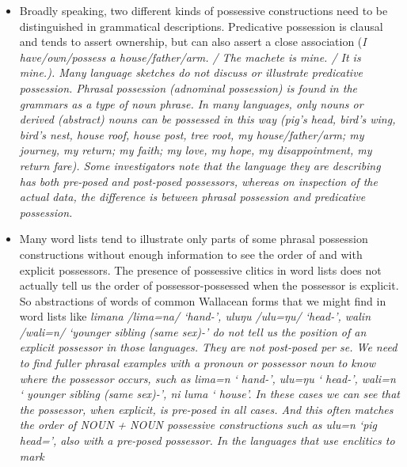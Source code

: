 \begin{itemize}
	\item Broadly speaking,
				two different kinds of possessive constructions need to be distinguished in grammatical descriptions.
				Predicative possession is clausal
				and tends to assert ownership,
				but can also assert a close association (\it{I have/own/possess a house/father/arm.
				/ The machete is mine.
				/ It is mine.}).
				Many language sketches do not discuss or illustrate predicative possession.
				Phrasal possession (adnominal possession) is found in the grammars
				as a type of noun phrase.
				In many languages, only nouns or derived (abstract) nouns can
				be possessed in this way (\it{pig’s head,
				bird’s wing, bird’s nest,
				house roof, house post,
				tree root, my house/father/arm; my journey,
				my return; my faith; my love,
				my hope, my disappointment, my return fare}).
				Some investigators note that the language they are describing
				has both pre-posed and post-posed possessors, whereas on inspection of the actual
				data, the difference is between phrasal possession and predicative possession.
	\item Many word lists tend to illustrate only parts of some
				phrasal possession constructions without enough information to
				see the order of 
				and  with explicit possessors.
				The presence of possessive clitics in word lists does not actually
				tell us the order of possessor-possessed when the possessor is explicit.
				So abstractions of words of common Wallacean forms that we might
				find in word lists like \it{limana} /lima=na/ ‘hand-’,
				\it{uluŋu} /ulu=ŋu/ ‘head-’, \it{walin} /wali=n/
				‘younger sibling (same sex)-’ do not tell us the
				position of an explicit possessor in those languages.
				They are not post-posed per se.
				We need to find fuller phrasal examples with a pronoun or possessor
				noun to know where the possessor occurs,
				such as \it{ lima=n} ‘ hand-’,
				\it{ ulu=ŋu} ‘ head-’,
				\it{ wali=n} ‘ younger sibling (same sex)-’,
				\it{ ni luma} ‘ house’.
				In these cases we can see that the possessor,
				when explicit, is pre-posed in all cases.
				And this often matches the order of NOUN + NOUN possessive constructions
				such as \it{ ulu=n} ‘pig head=’,
				also with a pre-posed possessor.
				In the  languages that use enclitics to mark

\end{itemize}
